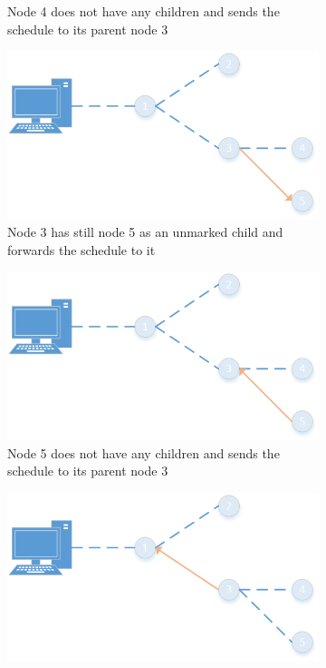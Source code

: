 \begin{figure}[htbp]
\begin{subfigure}[t]{0.4\textwidth}
        \caption{Node 4 does not have any children and sends the schedule to its parent node 3}
        \label{fig:spreading6}
    \end{subfigure}
    \quad
    \quad
    \begin{subfigure}[t]{0.4\textwidth}
		\centering         
        \includegraphics[scale=0.6]{content/images/ScheduleSpreading/Part7}
        \caption{Node 3 has still node 5 as an unmarked child and forwards the schedule to it}
        \label{fig:spreading7}
    \end{subfigure}
    \quad
    \quad
    \begin{subfigure}[t]{0.4\textwidth}
		\centering         
        \includegraphics[scale=0.6]{content/images/ScheduleSpreading/Part8}
        \caption{Node 5 does not have any children and sends the schedule to its parent node 3}
        \label{fig:spreading8}
    \end{subfigure}
    \quad
    \quad
    \begin{subfigure}[t]{0.4\textwidth}
		\centering
    		\includegraphics[scale=0.6]{content/images/ScheduleSpreading/Part9}

\end{subfigure}
\end{figure}
